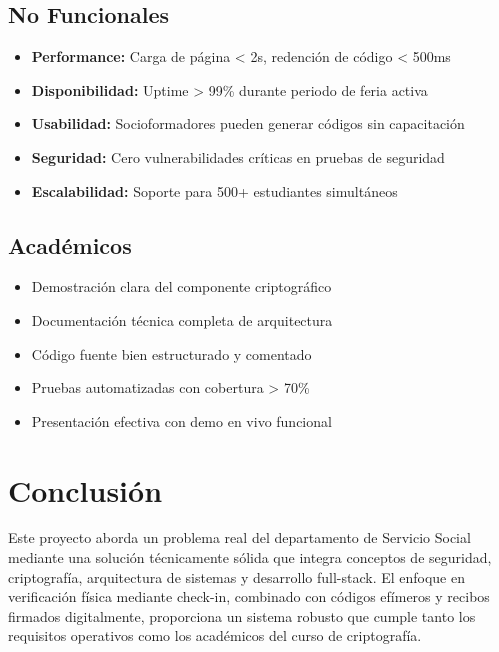 \documentclass[12pt,a4paper]{article}
\begin{document}
\subsection{No Funcionales}

\begin{itemize}[leftmargin=*]
    \item \textbf{Performance:} Carga de página < 2s, redención de código < 500ms
    \item \textbf{Disponibilidad:} Uptime > 99\% durante periodo de feria activa
    \item \textbf{Usabilidad:} Socioformadores pueden generar códigos sin capacitación
    \item \textbf{Seguridad:} Cero vulnerabilidades críticas en pruebas de seguridad
    \item \textbf{Escalabilidad:} Soporte para 500+ estudiantes simultáneos
\end{itemize}

\subsection{Académicos}

\begin{itemize}[leftmargin=*]
    \item Demostración clara del componente criptográfico
    \item Documentación técnica completa de arquitectura
    \item Código fuente bien estructurado y comentado
    \item Pruebas automatizadas con cobertura > 70\%
    \item Presentación efectiva con demo en vivo funcional
\end{itemize}

\section{Conclusión}

Este proyecto aborda un problema real del departamento de Servicio Social mediante una solución técnicamente sólida que integra conceptos de seguridad, criptografía, arquitectura de sistemas y desarrollo full-stack. El enfoque en verificación física mediante check-in, combinado con códigos efímeros y recibos firmados digitalmente, proporciona un sistema robusto que cumple tanto los requisitos operativos como los académicos del curso de criptografía.
\end{document}
